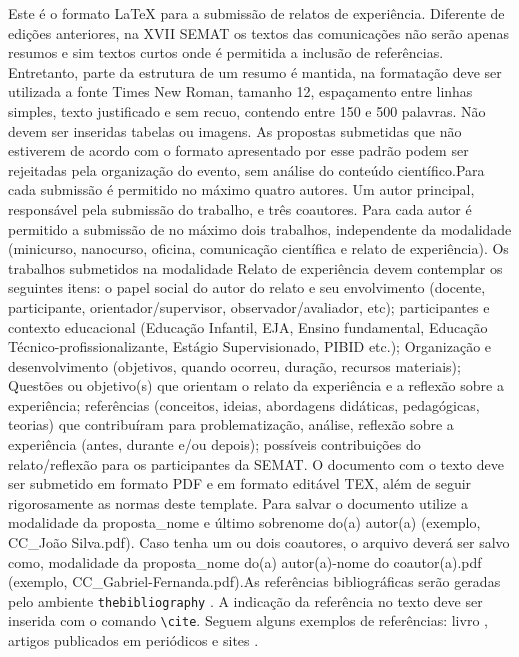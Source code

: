 \documentclass{semat}
\begin{document}
\noindent Este é o formato \LaTeX{} para a submissão de relatos de experiência. Diferente de edições anteriores, na XVII SEMAT os textos das comunicações não serão apenas resumos e sim textos curtos onde é permitida a inclusão de referências. Entretanto, parte da estrutura de um resumo é mantida,  na formatação deve ser utilizada a fonte Times New Roman, tamanho 12, espaçamento entre linhas simples, texto justificado e sem recuo, contendo entre 150 e 500 palavras. Não devem ser inseridas tabelas ou imagens. As propostas submetidas que não estiverem de acordo com o formato apresentado por esse padrão podem ser rejeitadas pela organização do evento, sem análise do conteúdo científico.Para cada submissão é permitido no máximo quatro autores. Um autor principal, responsável pela submissão do trabalho, e três coautores. Para cada autor é permitido a submissão de no máximo dois trabalhos, independente da modalidade (minicurso, nanocurso, oficina, comunicação científica e relato de experiência). Os trabalhos submetidos na modalidade Relato de experiência devem contemplar os seguintes itens: o papel social do autor do relato e seu envolvimento (docente, participante, orientador/supervisor, observador/avaliador, etc); participantes e contexto educacional (Educação Infantil, EJA, Ensino fundamental, Educação Técnico-profissionalizante, Estágio Supervisionado, PIBID etc.); Organização e desenvolvimento (objetivos, quando ocorreu, duração, recursos materiais); Questões ou objetivo(s) que orientam o relato da experiência e a reflexão sobre a experiência; referências (conceitos, ideias, abordagens didáticas, pedagógicas, teorias) que contribuíram para problematização, análise, reflexão sobre a experiência (antes, durante e/ou depois); possíveis contribuições do relato/reflexão para os participantes da SEMAT. O documento com o texto deve ser submetido em formato PDF e em formato editável TEX, além de seguir rigorosamente as normas deste template. Para salvar o documento utilize a modalidade da proposta\_nome e último sobrenome do(a) autor(a) (exemplo, CC\_João Silva.pdf). Caso tenha um ou dois coautores, o arquivo deverá ser salvo como, modalidade da proposta\_nome do(a) autor(a)-nome do coautor(a).pdf (exemplo, CC\_Gabriel-Fernanda.pdf).As referências bibliográficas serão geradas pelo ambiente \verb+thebibliography+ . A indicação da referência no texto deve ser inserida com o comando \verb+\cite+. Seguem alguns exemplos de referências: livro \cite{conway2013sphere}, artigos publicados em periódicos \cite{burger2004derivatives} e sites \cite{EnCoRI}. 
\end{document}
